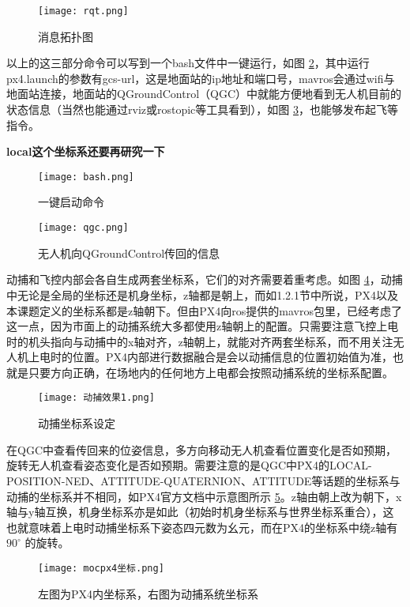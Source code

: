 \begin{figure}[!h]
  \centering
  \texttt{[image: rqt.png]}
  \caption{消息拓扑图}
  \label{rqt}
\end{figure}

以上的这三部分命令可以写到一个bash文件中一键运行，如图 \ref{一键}，其中运行px4.launch的参数有gcs-url，这是地面站的ip地址和端口号，mavros会通过wifi与地面站连接，地面站的QGroundControl（QGC）中就能方便地看到无人机目前的状态信息（当然也能通过rviz或rostopic等工具看到），如图 \ref{qgc}，也能够发布起飞等指令。

\textbf{local这个坐标系还要再研究一下}

\begin{figure}[!h]
  \centering
  \texttt{[image: bash.png]}
  \caption{一键启动命令}
  \label{一键}
\end{figure}

\begin{figure}[!h]
  \centering
  \texttt{[image: qgc.png]}
  \caption{无人机向QGroundControl传回的信息}
  \label{qgc}
\end{figure}

动捕和飞控内部会各自生成两套坐标系，它们的对齐需要着重考虑。如图 \ref{动捕效果}，动捕中无论是全局的坐标还是机身坐标，z轴都是朝上，而如1.2.1节中所说，PX4以及本课题定义的坐标系都是z轴朝下。但由PX4向ros提供的mavros包里，已经考虑了这一点，因为市面上的动捕系统大多都使用z轴朝上的配置。只需要注意飞控上电时的机头指向与动捕中的x轴对齐，z轴朝上，就能对齐两套坐标系\cite{px4moc}，而不用关注无人机上电时的位置。PX4内部进行数据融合是会以动捕信息的位置初始值为准，也就是只要方向正确，在场地内的任何地方上电都会按照动捕系统的坐标系配置。

\newpage

\begin{figure}[!h]
  \centering
  \texttt{[image: 动捕效果1.png]}
  \caption{动捕坐标系设定}
  \label{动捕效果}
\end{figure}

在QGC中查看传回来的位姿信息，多方向移动无人机查看位置变化是否如预期，旋转无人机查看姿态变化是否如预期。需要注意的是QGC中PX4的LOCAL-POSITION-NED、ATTITUDE-QUATERNION、ATTITUDE等话题的坐标系与动捕的坐标系并不相同，如PX4官方文档\cite{px4moc}中示意图所示 \ref{mocpx4}。z轴由朝上改为朝下，x轴与y轴互换，机身坐标系亦是如此（初始时机身坐标系与世界坐标系重合），这也就意味着上电时动捕坐标系下姿态四元数为幺元，而在PX4的坐标系中绕z轴有$90  ^{\circ}$ 的旋转。

\begin{figure}[!h]
  \centering
  \texttt{[image: mocpx4坐标.png]}
  \caption{左图为PX4内坐标系，右图为动捕系统坐标系}
  \label{mocpx4}
\end{figure}

